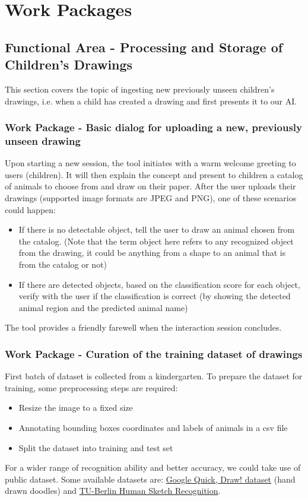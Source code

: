 \section{Work Packages}

\subsection{Functional Area - Processing and Storage of Children's Drawings}
This section covers the topic of ingesting new previously unseen children's drawings, i.e. when a child has created a drawing and first presents it to our AI.

\subsubsection{Work Package - Basic dialog for uploading a new, previously unseen drawing}
Upon starting a new session, the tool initiates with a warm welcome greeting to users (children).
It will then explain the concept and present to children a catalog of animals to choose from and draw on their paper.
After the user uploads their drawings (supported image formats are JPEG and PNG), one of these scenarios could happen:
\begin{itemize}
\item If there is no detectable object, tell the user to draw an animal chosen from the catalog.
(Note that the term object here refers to any recognized object from the drawing, it could be anything from a shape to an animal that is from the catalog or not)
\item If there are detected objects, based on the classification score for each object, verify with the user if the classification is correct (by showing the detected animal region and the predicted animal name)
\end{itemize}
The tool provides a friendly farewell when the interaction session concludes.

\subsubsection{Work Package - Curation of the training dataset of drawings}
First batch of dataset is collected from a kindergarten.
To prepare the dataset for training, some preprocessing steps are required:
\begin{itemize}
\item Resize the image to a fixed size
\item Annotating bounding boxes coordinates and labels of animals in a csv file
\item Split the dataset into training and test set
\end{itemize}
For a wider range of recognition ability and better accuracy, we could take use of public dataset.
Some available datasets are: \href{https://github.com/googlecreativelab/quickdraw-dataset}{Google Quick, Draw! dataset} (hand drawn doodles) and \href{https://cybertron.cg.tu-berlin.de/eitz/projects/classifysketch/}{TU-Berlin Human Sketch Recognition}.


